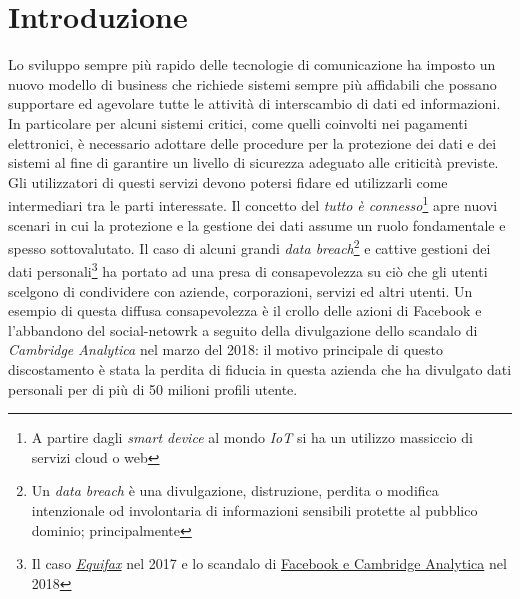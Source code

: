 \chapter*{Introduzione}
Lo sviluppo sempre più rapido delle tecnologie di comunicazione ha imposto un nuovo modello di business che richiede sistemi sempre più affidabili che possano supportare ed agevolare tutte le attività di interscambio di dati ed informazioni. In particolare per alcuni sistemi critici, come quelli coinvolti nei pagamenti elettronici, è necessario adottare delle procedure per la protezione dei dati e dei sistemi al fine di garantire un livello di sicurezza adeguato alle criticità previste. Gli utilizzatori di questi servizi devono potersi fidare ed utilizzarli come intermediari tra le parti interessate.\newline\newline
Il concetto del \textit{tutto è connesso}\footnote{A partire dagli \textit{smart device} al mondo \textit{IoT} si ha un utilizzo massiccio di servizi cloud o web} apre nuovi scenari in cui la protezione e la gestione dei dati assume un ruolo fondamentale e spesso sottovalutato. Il caso di alcuni grandi \textit{data breach}\footnote{Un \textit{data breach} è una divulgazione, distruzione, perdita o modifica intenzionale od involontaria di informazioni sensibili protette al pubblico dominio; principalmente } e cattive gestioni dei dati personali\footnote{Il caso \href{https://www.nytimes.com/2017/09/07/business/equifax-cyberattack.html}{\textit{Equifax}} nel 2017 e lo scandalo di \href{https://www.washingtonpost.com/business/understanding-the-facebook-cambridge-analytica-story-quicktake/2018/04/09/0f18d91c-3c1c-11e8-955b-7d2e19b79966_story.html}{Facebook e Cambridge Analytica} nel 2018} ha portato ad una presa di consapevolezza su ciò che gli utenti scelgono di condividere con aziende, corporazioni, servizi ed altri utenti.\newline
Un esempio di questa diffusa consapevolezza è il crollo delle azioni di Facebook e l'abbandono del social-netowrk a seguito della divulgazione dello scandalo di \textit{Cambridge Analytica} nel marzo del 2018: il motivo principale di questo discostamento è stata la perdita di fiducia in questa azienda che ha divulgato dati personali per di più di 50 milioni profili utente.\newline
